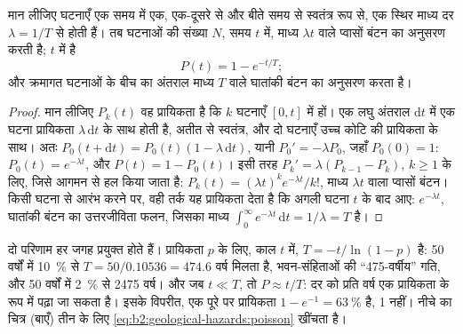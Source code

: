 \begin{proposition}[प्वासों पुनरावृत्ति मॉडल]\label{prop:b2:geological-hazards:poisson}
मान लीजिए घटनाएँ एक समय में एक, एक-दूसरे से और बीते समय से
स्वतंत्र रूप से, एक स्थिर माध्य दर $\lambda = 1/T$ से होती हैं। तब घटनाओं की संख्या $N$, समय $t$ में,
माध्य $\lambda t$ वाले प्वासों बंटन का अनुसरण करती है; $t$ में  है
\begin{equation}
P(t) = 1 - e^{-t/T};
\label{eq:b2:geological-hazards:poisson}
\end{equation}
और क्रमागत घटनाओं के बीच का अंतराल माध्य $T$ वाले घातांकी बंटन का अनुसरण करता है।
\end{proposition}

\begin{proof}
मान लीजिए $P_k(t)$ वह प्रायिकता है कि $k$ घटनाएँ $[0, t]$ में हों। एक लघु अंतराल $\mathrm{d}t$ में एक
घटना प्रायिकता $\lambda\,\mathrm{d}t$ के साथ होती है, अतीत से स्वतंत्र, और दो घटनाएँ उच्च कोटि की
प्रायिकता के साथ। अतः $P_0(t + \mathrm{d}t) = P_0(t)(1 - \lambda\,\mathrm{d}t)$, यानी
$P_0' = -\lambda P_0$, जहाँ $P_0(0) = 1$: $P_0(t) = e^{-\lambda t}$, और $P(t) = 1 - P_0(t)$। इसी
तरह $P_k' = \lambda(P_{k-1} - P_k)$, $k \geq 1$ के लिए, जिसे आगमन से हल किया जाता है:
$P_k(t) = (\lambda t)^k e^{-\lambda t}/k!$, माध्य $\lambda t$ वाला प्वासों बंटन। किसी घटना से
आरंभ करने पर, वही तर्क यह प्रायिकता देता है कि अगली घटना $t$ के बाद आए:
$e^{-\lambda t}$, घातांकी बंटन का उत्तरजीविता फलन, जिसका माध्य
$\int_0^\infty e^{-\lambda t}\,\mathrm{d}t = 1/\lambda = T$ है।
\end{proof}

दो परिणाम हर जगह प्रयुक्त होते हैं। प्रायिकता $p$ के लिए,  काल $t$ में,  $T = -t/\ln(1 - p)$ है: 50 वर्षों में \qty{10}{\percent} से $T = 50/0.10536 =
474.6$ वर्ष मिलता है, भवन-संहिताओं की ``475-वर्षीय'' गति, और 50 वर्षों में \qty{2}{\percent}
से 2475 वर्ष। और जब $t \ll T$, तो $P \approx t/T$: दर को प्रति वर्ष एक
प्रायिकता के रूप में पढ़ा जा सकता है। इसके विपरीत, एक पूरे  पर प्रायिकता $1 - e^{-1} =
\qty{63}{\percent}$ है, 1 नहीं। नीचे का चित्र (बाएँ) तीन  के लिए
\eqref{eq:b2:geological-hazards:poisson} खींचता है।

